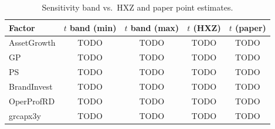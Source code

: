 \begin{table}[htbp]
  \centering
  \caption{Sensitivity band vs.\ HXZ and paper point estimates.}
  \label{tab:sensitivity-band}
  \begin{tabular}{lcccc}
    \toprule
    Factor & $t$ band (min) & $t$ band (max) & $t$ (HXZ) & $t$ (paper) \\
    \midrule
    AssetGrowth & TODO & TODO & TODO & TODO \\
    GP          & TODO & TODO & TODO & TODO \\
    PS          & TODO & TODO & TODO & TODO \\
    BrandInvest & TODO & TODO & TODO & TODO \\
    OperProfRD  & TODO & TODO & TODO & TODO \\
    grcapx3y    & TODO & TODO & TODO & TODO \\
    \bottomrule
  \end{tabular}
\end{table}
